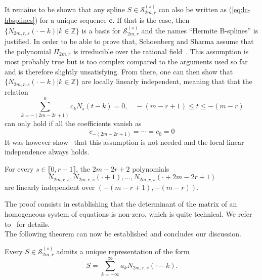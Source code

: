 It remains to be shown that any spline $S \in \mathscr{S}_{2m,r}^{(s)}$ can also be written as (\ref{eq:lc-hbsplines}) 
for a unique sequence $\bm{c}$. If that is the case, then $\{N_{2m,r,s}(\cdot-k) | k \in \mathbb{Z}\}$ is a basis for 
$\mathscr{S}_{2m,r}^{(s)}$ and the names ``Hermite B-splines'' is justified. In order to be able to prove that, 
Schoenberg and Sharma assume that the polynomial $\Pi_{2m,r}$ is irreducible over the rational field~\cite[Assumption 
1]{schoenberg_cardinal_1973}. This assumption is most probably true but is too complex compared to the arguments used so 
far and is therefore slightly unsatisfying. From there, one can then show that $\{N_{2m,r,s}(\cdot-k) | k \in 
\mathbb{Z}\}$ are locally linearly independent, meaning that that the relation 
\begin{equation*}
  \sum_{k=-(2m-2r+1)}^{0} c_k N_s(t-k) = 0, \quad  -(m-r+1) \leq t \leq -(m-r) 
\end{equation*}
can only hold if all the coefficients vanish as
\begin{equation*}
  c_{-(2m-2r+1)} = \cdots = c_0 = 0
\end{equation*}
It was however show~\cite{lee_b-splines_1975} that this assumption is not needed and the local linear independence always holds.
\begin{lem}\label{lemma:lee73}
  For every $s \in \llbracket0, r-1\rrbracket$, the $2m-2r+2$ polynomials
  \begin{equation*}
    N_{2m,r,s}, N_{2m,r,s}(\cdot+1), \ldots, N_{2m,r,s}(\cdot+2m-2r+1)
  \end{equation*}
  are linearly independent over $\left(-(m-r+1), -(m-r)\right)$.
\end{lem}

The proof consists in establishing that the determinant of the matrix of an homogeneous system of equations is non-zero, 
which is quite technical. We refer to~\cite{lee_b-splines_1975} for details. \\

The following theorem can now be established and concludes our discussion.
\begin{thm}
  Every $S \in \mathscr{S}_{2m,r}^{(s)}$ admits a unique representation of the form
  \begin{equation}\label{eq:expansion-Ns}
    S = \sum_{k=-\infty}^{\infty} a_k N_{2m,r,s}(\cdot-k).
  \end{equation}
\end{thm}

